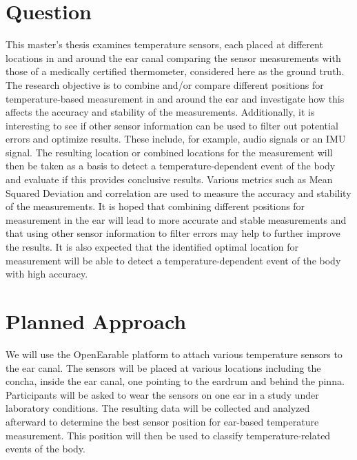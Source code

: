 \section{Question}
This master's thesis examines temperature sensors, each placed at different locations in and around the ear canal comparing the sensor measurements with those of a medically certified thermometer, considered here as the ground truth.
The research objective is to combine and/or compare different positions for temperature-based measurement in and around the ear and investigate how this affects the accuracy and stability of the measurements.
Additionally, it is interesting to see if other sensor information can be used to filter out potential errors and optimize results. These include, for example, audio signals or an IMU signal. The resulting location or combined locations for the measurement will then be taken as a basis to detect a temperature-dependent event of the body and evaluate if this provides conclusive results.
Various metrics such as Mean Squared Deviation and correlation are used to measure the accuracy and stability of the measurements.
It is hoped that combining different positions for measurement in the ear will lead to more accurate and stable measurements and that using other sensor information to filter errors may help to further improve the results. It is also expected that the identified optimal location for measurement will be able to detect a temperature-dependent event of the body with high accuracy.


\section{Planned Approach}
We will use the OpenEarable platform to attach various temperature sensors to the ear canal. 
The sensors will be placed at various locations including the concha, inside the ear canal, one pointing to the eardrum and behind the pinna. 
Participants will be asked to wear the sensors on one ear in a study under laboratory conditions.
The resulting data will be collected and analyzed afterward to determine the best sensor position for ear-based temperature measurement. This position will then be used to classify temperature-related events of the body.

